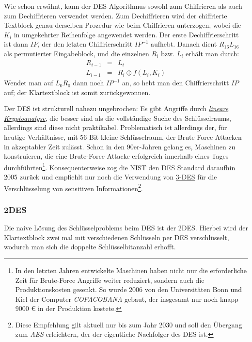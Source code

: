 Wie schon erwähnt, kann der DES-Algorithmus sowohl zum Chiffrieren als auch zum Dechiffrieren verwendet werden. Zum Dechiffrieren wird der chiffrierte
Textblock genau derselben Prozedur wie beim Chiffrieren unterzogen, wobei die $K_i$ in umgekehrter Reihenfolge angewendet werden. Der erste Dechiffrierschritt
ist dann $IP$, der den letzten Chiffrierschritt $IP^{-1}$ aufhebt. Danach dient $R_{16}L_{16}$ als permutierter Eingabeblock, und die einzelnen $R_i$ bzw.
$L_i$ erhält man durch:
\begin{eqnarray*}
	R_{i-1}	& = 	& L_i \\
	L_{i-1}	& = 	& R_i\oplus f(L_i,K_i)
\end{eqnarray*}
Wendet man auf $L_0R_0$ dann noch $IP^{-1}$ an, so hebt man den Chiffrierschritt $IP$ auf; der Klartextblock ist somit zurückgewonnen.

Der DES ist strukturell nahezu ungebrochen: Es gibt Angriffe durch \hyperref[sssec:linKryptoanalyse]{\textit{lineare Kryptoanalyse}}, die besser sind als die vollständige Suche des Schlüsselraums, allerdings sind diese nicht praktikabel. Problematisch ist allerdings der, für heutige Verhältnisse, mit 56 Bit kleine Schlüsselraum, der Brute-Force Attacken in akzeptabler Zeit zulässt. Schon in den 90er-Jahren gelang es, Maschinen zu konstruieren, die eine Brute-Force Attacke erfolgreich innerhalb eines Tages durchführten\footnote{In den letzten Jahren entwickelte Maschinen haben nicht nur die erforderliche Zeit für Brute-Force Angriffe weiter reduziert, sondern auch die Produktionskosten gesenkt. So wurde 2006 von den Universitäten Bonn und Kiel der Computer \textit{COPACOBANA} gebaut, der insgesamt nur noch knapp 9000 \euro{} in der Produktion kostete.}. Konsequenterweise zog die NIST den DES Standard daraufhin 2005 zurück und empfiehlt nur noch die Verwendung von \hyperref[sssec:3des]{3-DES} für die Verschlüsselung von sensitiven Informationen\footnote{Diese Empfehlung gilt aktuell nur bis zum Jahr 2030 und soll den Übergang zum \textit{AES} erleichtern, der der eigentliche Nachfolger des DES ist.}.

\subsubsection{2DES}
Die naive Lösung des Schlüsselproblems beim DES ist der 2DES. Hierbei wird der Klartextblock zwei mal mit verschiedenen Schlüsseln per DES verschlüsselt, wodurch
man sich die doppelte Schlüsselbitanzahl erhofft.

